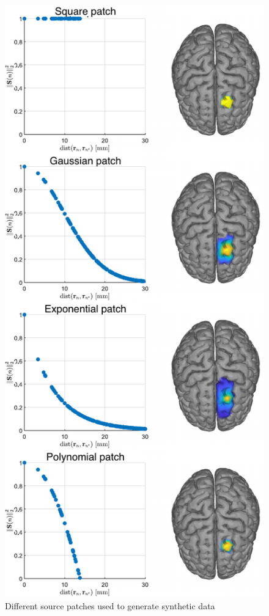 \begin{figure}
\centering
\includegraphics[scale=0.9]{./img/profiles.pdf}
\caption{Different source patches used to generate synthetic data}
\label{fig:exaple_true}
\end{figure}

